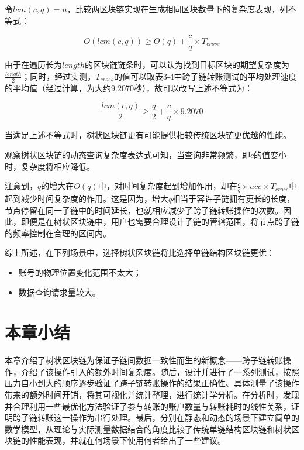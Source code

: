 令$lcm(c, q) = n$，比较两区块链实现在生成相同区块数量下的复杂度表现，列不等式：

$$
    O(lcm(c, q)) \geq O(q) + \frac{c}{q} \times T_{cross}
$$

由于在遍历长为$length$的区块链链条时，可以认为找到目标区块的期望复杂度为$\frac{length}{2}$；同时，经过实测，$T_{cross}$的值可以取表3-4中跨子链转账测试的平均处理速度的平均值（经过计算，为大约9.2070秒），故可以改写上述不等式为：

$$
    \frac{lcm(c, q)}{2} \geq \frac{q}{2} + \frac{c}{q} \times 9.2070
$$

当满足上述不等式时，树状区块链更有可能提供相较传统区块链更优越的性能。

观察树状区块链的动态查询复杂度表达式可知，当查询非常频繁，即$c$的值变小时，复杂度将相应降低。

注意到，$q$的增大在$O(q)$中，对时间复杂度起到增加作用，却在$\frac{c}{q} \times acc \times T_{cross}$中起到减少时间复杂度的作用。这是因为，增大$q$相当于容许子链拥有更长的长度，节点停留在同一子链中的时间延长，也就相应减少了跨子链转账操作的次数。因此，即便是在树状区块链中，用户也需要合理设计子链的管辖范围，将节点跨子链的频率控制在合理的区间内。

综上所述，在下列场景中，选择树状区块链将比选择单链结构区块链更优：

\begin{itemize}
    \item 账号的物理位置变化范围不太大；
    \item 数据查询请求量较大。
\end{itemize}

\section{本章小结}

本章介绍了树状区块链为保证子链间数据一致性而生的新概念——跨子链转账操作，介绍了该操作引入的额外时间复杂度。随后，设计并进行了一系列测试，按照压力自小到大的顺序逐步验证了跨子链转账操作的结果正确性、具体测量了该操作带来的额外时间开销，将其可视化并统计整理，进行统计学分析。在分析时，发现并合理利用一些最优化方法验证了参与转账的账户数量与转账耗时的线性关系，证明跨子链转账这一操作为串行处理。最后，分别在静态和动态的场景下建立简单的数学模型，从理论与实际测量数据结合的角度比较了传统单链结构区块链和树状区块链的性能表现，并就在何场景下使用何者给出了一些建议。
